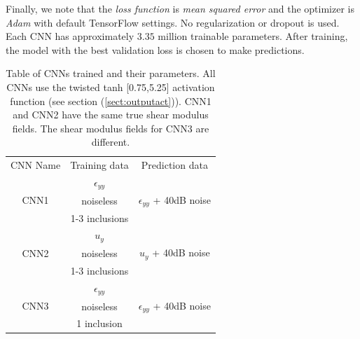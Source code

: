 \documentclass[12pt]{article}
\begin{document}
Finally, we note that the \textit{loss function} is \textit{mean squared error} and the optimizer is \textit{Adam} \cite{misc:kingma2017adam} with default TensorFlow settings. No regularization or dropout is used.  Each CNN has approximately $3.35$ million trainable parameters. After training, the model with the best validation loss is chosen to make predictions.
%
\begin{center}
\begin{table}
  \centering
  \begin{tabular}{|c|c|c|}
    \hline
    \multirow{2}{*}{CNN Name} &  \multirow{2}{*}{Training data}           & \multirow{2}{*}{Prediction data}\\
                              &                                           &  \\
     \hline
     \multirow{3}{*}{CNN1}    &  $\epsilon_{yy}$                           &  \multirow{3}{*}{$\epsilon_{yy}$ + 40dB noise}\\
                              &  noiseless                                & \\
                              &  1-3 inclusions                           &\\
     \hline
     \multirow{3}{*}{CNN2}    &  $u_{y}$                                   & \multirow{3}{*}{$u_{y}$ + 40dB noise}\\
                              &  noiseless                                & \\
                              &  1-3 inclusions                           &\\  
     \hline
     \multirow{3}{*}{CNN3}    &  $\epsilon_{yy}$                           & \multirow{3}{*}{$\epsilon_{yy}$ + 40dB noise}\\
                              &  noiseless                                & \\
                              &  1 inclusion                              & \\

    \hline
  \end{tabular}
  \caption{\label{table:cnnparams} Table of CNNs trained and their parameters. All CNNs use the twisted tanh [0.75,5.25] activation function (see section (\ref{sect:outputact})). CNN1 and CNN2 have the same true shear modulus fields. The shear modulus fields for CNN3 are different.}
\end{table}
\end{center}
%
\end{document}

